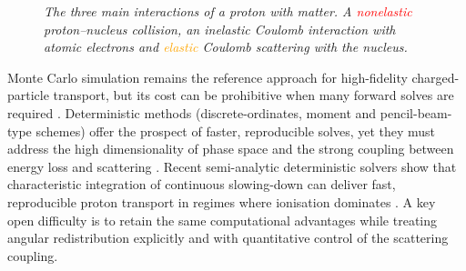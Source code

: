 \documentclass[final]{amsart}
\begin{document}
\begin{figure}[h!]

    \caption{\em The three main interactions of a proton with matter.
      A \textcolor{red}{nonelastic} proton--nucleus collision, an
      \textcolor{cyan!80!white}{inelastic} Coulomb interaction with
      atomic electrons and \textcolor{orange}{elastic} Coulomb
      scattering with the nucleus.
      \label{fig:atom}
    }
\end{figure}

Monte Carlo simulation remains the reference approach for
high-fidelity charged-particle transport, but its cost can be
prohibitive when many forward solves are required
\cite{kan2013review}. Deterministic methods (discrete-ordinates,
moment and pencil-beam-type schemes) offer the prospect of faster,
reproducible solves, yet they must address the high dimensionality of
phase space and the strong coupling between energy loss and scattering
\cite{stammer2024deterministic,yu2025review}. Recent semi-analytic
deterministic solvers show that characteristic integration of
continuous slowing-down can deliver fast, reproducible proton
transport in regimes where ionisation dominates
\cite{ashby2025efficient}. A key open difficulty is to retain the same
computational advantages while treating angular redistribution
explicitly and with quantitative control of the scattering coupling.
\end{document}
